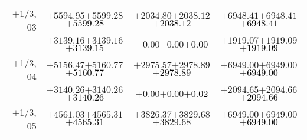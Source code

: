 \documentclass[compress]{beamer}
\begin{document}
\begin{frame}
{\begin{tabular}{r | c | c | c}
$+$1/3, 03 & $+5594.95$\hspace{0.1 cm}$+5599.28$\hspace{0.1 cm}\textcolor{black}{$+5599.28$} & $+2034.80$\hspace{0.1 cm}$+2038.12$\hspace{0.1 cm}\textcolor{black}{$+2038.12$} & $+6948.41$\hspace{0.1 cm}$+6948.41$\hspace{0.1 cm}\textcolor{black}{$+6948.41$} \\
           & $+3139.16$\hspace{0.1 cm}$+3139.16$\hspace{0.1 cm}\textcolor{black}{$+3139.15$} & $-0.00$\hspace{0.1 cm}$-0.00$\hspace{0.1 cm}\textcolor{black}{$+0.00$} & $+1919.07$\hspace{0.1 cm}$+1919.09$\hspace{0.1 cm}\textcolor{black}{$+1919.09$} \\
$+$1/3, 04 & $+5156.47$\hspace{0.1 cm}$+5160.77$\hspace{0.1 cm}\textcolor{black}{$+5160.77$} & $+2975.57$\hspace{0.1 cm}$+2978.89$\hspace{0.1 cm}\textcolor{black}{$+2978.89$} & $+6949.00$\hspace{0.1 cm}$+6949.00$\hspace{0.1 cm}\textcolor{black}{$+6949.00$} \\
           & $+3140.26$\hspace{0.1 cm}$+3140.26$\hspace{0.1 cm}\textcolor{black}{$+3140.26$} & $+0.00$\hspace{0.1 cm}$+0.00$\hspace{0.1 cm}\textcolor{black}{$+0.02$} & $+2094.65$\hspace{0.1 cm}$+2094.66$\hspace{0.1 cm}\textcolor{black}{$+2094.66$} \\
$+$1/3, 05 & $+4561.03$\hspace{0.1 cm}$+4565.31$\hspace{0.1 cm}\textcolor{black}{$+4565.31$} & $+3826.37$\hspace{0.1 cm}$+3829.68$\hspace{0.1 cm}\textcolor{black}{$+3829.68$} & $+6949.00$\hspace{0.1 cm}$+6949.00$\hspace{0.1 cm}\textcolor{black}{$+6949.00$} \\

\end{tabular}}
\end{frame}
\end{document}
